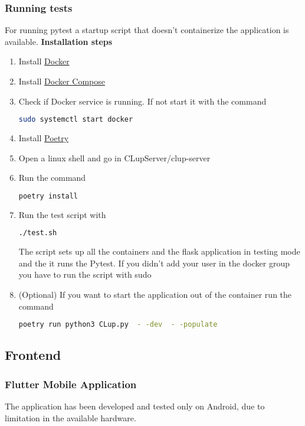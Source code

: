 \subsubsection{Running tests}
For running pytest a startup script that doesn't containerize the application is available.
\textbf{Installation steps}
\begin{enumerate}
    \item Install \href{https://docs.docker.com/get-docker/}{Docker}
    \item Install \href{https://docs.docker.com/compose/install/}{Docker Compose}
    \item Check if Docker service is running. If not start it with the command
          \begin{lstlisting}[language=bash]
    sudo systemctl start docker
    \end{lstlisting}
    \item Install \href{https://python-poetry.org/}{Poetry}
    \item Open a linux shell and go in CLupServer/clup-server
    \item Run the command
          \begin{lstlisting}[language=bash]
    poetry install
    \end{lstlisting}
    \item Run the test script with
          \begin{lstlisting}[language=bash]
    ./test.sh
    \end{lstlisting}
          The script sets up all the containers and the flask application in testing mode and the it runs the Pytest.
          If you didn't add your user in the docker group
          you have to run the script with sudo
    \item (Optional) If you want to start the application out of the container run the command
          \begin{lstlisting}[language=bash]
    poetry run python3 CLup.py  - -dev  - -populate
    \end{lstlisting}
\end{enumerate}

\subsection{Frontend}

\subsubsection{Flutter Mobile Application}
The application has been developed and tested only on Android, due to limitation in the available hardware.

